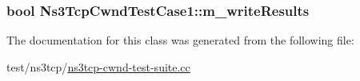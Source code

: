 \subsubsection[{\texorpdfstring{m\+\_\+write\+Results}{m_writeResults}}]{\setlength{\rightskip}{0pt plus 5cm}bool Ns3\+Tcp\+Cwnd\+Test\+Case1\+::m\+\_\+write\+Results\hspace{0.3cm}{\ttfamily [private]}}\hypertarget{classNs3TcpCwndTestCase1_a190399add30bd33923dcd99ef55ec603}{}\label{classNs3TcpCwndTestCase1_a190399add30bd33923dcd99ef55ec603}


The documentation for this class was generated from the following file\+:\begin{DoxyCompactItemize}
\item 
test/ns3tcp/\hyperlink{ns3tcp-cwnd-test-suite_8cc}{ns3tcp-\/cwnd-\/test-\/suite.\+cc}\end{DoxyCompactItemize}
